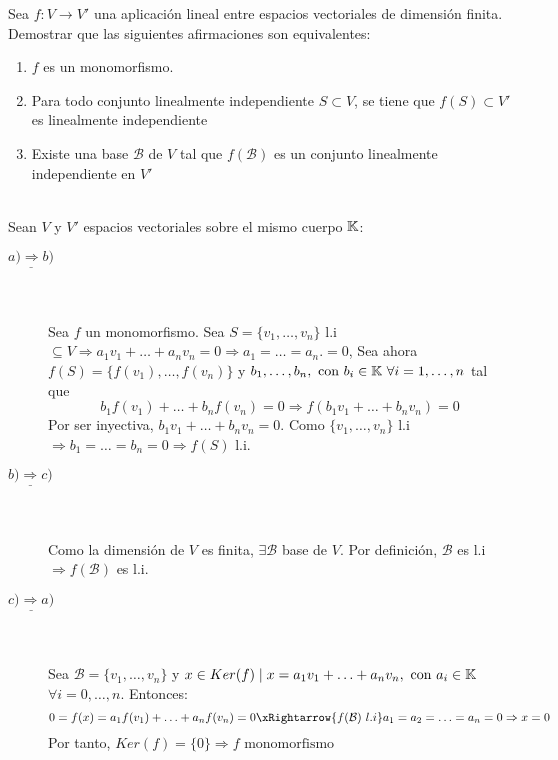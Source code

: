 \documentclass[12pt]{article}
\begin{document}
\begin{ejercicio}[3 puntos] Sea $f: V \rightarrow V'$ una aplicación lineal entre espacios vectoriales de dimensión finita. Demostrar que las siguientes afirmaciones son equivalentes:
    \begin{enumerate}[label=\alph*.]
    \item $f$ es un monomorfismo.
    \item Para todo conjunto linealmente independiente $S \subset V$, se tiene que $f(S) \subset V'$ es linealmente independiente
    \item Existe una base $\mathcal{B}$ de $V$ tal que $f(\mathcal{B})$ es un conjunto linealmente independiente en $V'$ 
    \end{enumerate} \\

        
        \noindent
        Sean $V$ y $V'$ espacios vectoriales sobre el mismo cuerpo ${\mathbb{K}}$:
        \begin{description}
            \item[$\underline{a) \Rightarrow b)}$] \ \\\\
            Sea $f$ un monomorfismo. Sea $S = \{v_1,\dotsc, v_n\}$ l.i $\subseteq V\Rightarrow a_1v_1 + \dotsc + a_nv_n = 0 \Rightarrow a_1 = \dotsc = a_n. = 0$, Sea ahora  $f(S) = \{f(v_1), \dotsc, f(v_n)\}$ y $b_1,\dotsc,b_n, \text{ con } b_i \in \K \ \forall i = 1,\dotsc,n$ tal que
            \begin{equation*}
                b_1f(v_1) + \dotsc + b_nf(v_n) = 0 \Rightarrow f(b_1v_1 + \dotsc + b_nv_n) = 0
            \end{equation*}
            Por ser inyectiva, $b_1v_1+ \dotsc + b_nv_n = 0$. Como $\{v_1,\dotsc,v_n\}$ l.i $\Rightarrow b_1 = \dotsc = b_n = 0 \Rightarrow f(S)$ l.i.
            \item[$\underline{b) \Rightarrow c)}$] \ \\\\
            Como la dimensión de $V$ es finita, $\exists \mathcal{B}$ base de $V$. Por definición, $\mathcal{B}$ es l.i $\Rightarrow f(\mathcal{B})$ es l.i.

            \item[$\underline{c) \Rightarrow a)}$] \ \\\\
            Sea $\mathcal{B} = \{v_1,\dotsc,v_n\}$ y $x \in Ker(f) \mid x = a_1v_1+\dotsc+a_nv_n, \text{ con } a_i \in {\mathbb{K}}$ $\forall i = 0,\dotsc,n$. Entonces:
            \begin{equation*}
                0 = f(x) = a_1f(v_1)+\dotsc+a_nf(v_n) = 0 \xRightarrow{f(\mathcal{B}) \ l.i} a_1 = a_2 = \dotsc = a_n= 0 \Rightarrow x = 0
            \end{equation*}
            Por tanto, $Ker(f) = \{0\} \Rightarrow f \text{ monomorfismo }$
        \end{description}
    \end{ejercicio}
    
\end{document}
